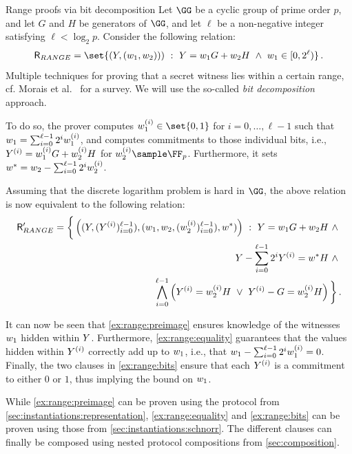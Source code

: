 \documentclass[11pt]{article}
\begin{document}
\begin{example}{Range proofs via bit decomposition}{}
  Let $\GG$ be a cyclic group of prime order $p$, and let $G$ and $H$ be generators of $\GG$, and let $\ell$ be a non-negative integer satisfying $\ell<\log_2 p$.
	Consider the following relation:
  $$
	  \relation_{RANGE} = \set{\left(\statement,(\witness_1,\witness_2))\right)~:~\statement=\witness_1 G +\witness_2 H ~\land~ \witness_1\in[0,2^\ell)}\,.
	$$
	Multiple techniques for proving that a secret witness lies within a certain range, cf. Morais et al.~\cite{range-proof-survey} for a survey.
	We will use the so-called \emph{bit decomposition} approach.

	To do so, the prover computes $\witness_1^{(i)}\in\set{0,1}$ for $i=0,\dots,\ell-1$ such that $w_1=\sum_{i=0}^{\ell-1}2^iw_1^{(i)}$, and computes commitments to those individual bits, i.e., $Y^{(i)}=w_1^{(i)}G+w_2^{(i)}H$ for $\witness_2^{(i)}\sample\FF_p$.
	Furthermore, it sets $w^*=w_2-\sum_{i=0}^{\ell-1}2^iw_2^{(i)}$.

  Assuming that the discrete logarithm problem is hard in $\GG$, the above relation is now equivalent to the following relation:
  \begin{align}
	  \mathsf{R}_{RANGE}' = \bigg\{\left((Y,(Y^{(i)})_{i=0}^{\ell-1}),(w_1,w_2,(w_2^{(i)})_{i=0}^{\ell-1}),w^*)\right)~:~ 		Y=w_1 G +w_2 H ~\land~ \label{ex:range:preimage}\\
		Y-\sum_{i=0}^{\ell-1} 2^iY^{(i)} = w^* H ~\land~  \label{ex:range:equality}\\
		\bigwedge_{i=0}^{\ell-1} \left(Y^{(i)}=w_2^{(i)}H ~\lor~ Y^{(i)}-G=w_2^{(i)}H\right)\bigg\}\,.\label{ex:range:bits}
	\end{align}
	
	It can now be seen that \cref{ex:range:preimage} ensures knowledge of the witnesses $w_1$ hidden within $Y$.
	Furthermore, \cref{ex:range:equality} guarantees that the values hidden within $Y^{(i)}$ correctly add up to $w_1$, i.e., that $w_1-\sum_{i=0}^{\ell-1}2^iw_1^{(i)}=0$.
  Finally, the two clauses in \cref{ex:range:bits} ensure that each $Y^{(i)}$ is a commitment to either $0$ or $1$, thus implying the bound on $w_1$.
	
	While \cref{ex:range:preimage} can be proven using the protocol from \cref{sec:instantiations:representation}, \cref{ex:range:equality} and \cref{ex:range:bits} can be proven using those from \cref{sec:instantiations:schnorr}.
	The different clauses can finally be composed using nested protocol compositions from \cref{sec:composition}.	
\end{example}
\end{document}

